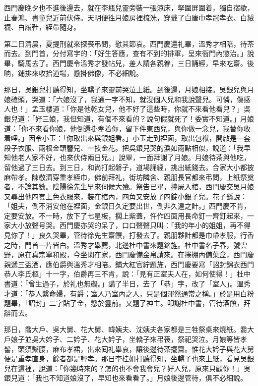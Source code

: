 西門慶晚夕也不進後邊去，就在李瓶兒靈旁裝一張涼床，拏圍屏圍着，獨自宿歇，止春鴻、書童兒近前伏侍。天明便徃月娘房裡梳洗，穿戴了白唐巾孝冠孝衣、白絨襪、白履鞋，絰帶隨身。

第二日清晨，夏提刑就來探䘮弔問，慰其節哀。西門慶還礼畢，溫秀才相陪，待茶而去。到門首，分付寫字的：「好生答應，查有不到的排軍，呈來衙門內懲治。」說畢，騎馬去了。西門慶令溫秀才發帖兒，差人請各親眷，三日誦經，早來吃齋。後晌，鋪排來收拾道場，懸掛佛像，不必細說。

那日，吳銀兒打聽得知，坐轎子來靈前哭泣上紙。到後邊，月娘相接。吳銀兒與月娘磕頭，哭道：「六娘沒了，我通一字不知，就沒個人兒和我說聲兒。可憐，傷感人也！」孟玉樓道：「你是他乾女兒，他不好了這些時，你就不來看他看兒？」吳銀兒道：「好三娘，我但知道，有個不來看的？說句假就死了！委實不知道。」月娘道：「你不來看你娘，他倒還掛牽着你，留下件東西兒，與你做一念兒，我替你收着哩。」因令小玉：「你取出來與銀姐看。」小玉走到裡面，取出包袱，開啟是一套段子衣服、兩根金頭簪兒、一技金花。把吳銀兒哭的淚如雨點相似，{}說道：「我早知他老人家不好，也來伏侍兩日兒。」說畢，一面拜謝了月娘。月娘待茶與他吃，留他過了三日去。到三日，和尚打起磐子，道場誦經，挑出紙錢去。合家大小都披麻帶孝。陳敬濟穿重孝絰巾，佛前拜礼，街坊隣舍、親朋長官都來弔問，上紙祭奠者，不論其數。陰陽徐先生早來伺候大殮。祭告已畢，擡屍入棺，西門慶交吳月娘又尋出他四套上色衣服來，裝在棺內，四角又安放了四錠小銀子兒。花子繇說：「姐夫，倒不消安他在裡面，金銀日久定要出世，倒非久遠之計。」西門慶不肯，定要安放。不一時，放下了七星板，擱上紫蓋，仵作四面用長命釘一齊釘起來，一家大小放聲号哭。西門慶亦哭的呆了，口口聲聲只叫：「我的年小的姐姐，再不得見你了！」良久哭畢，管待徐先生齋饌，打發去了。親朋夥計都是巾帶孝服，行香之時，門首一片皆白。溫秀才舉薦，北邊杜中書來題銘旌。杜中書名子春，號雲野，原在真宗寧和殿，今坐閑在家，西門慶備金帛請來。在捲棚內備菓盒，西門慶親遞三盃酒，應伯爵與溫秀才相陪。鋪大紅官紵題旌，西門慶要寫「詔封錦衣西門恭人李氏柩」十一字，伯爵再三不肯，說：「見有正室夫人在，如何使得！」{}杜中書道：「曾生過子，於礼也無礙。」講了半日，去了「恭」字，改了「室人」。溫秀才道：「恭人繫命婦，有爵；室人乃室內之人，只是個渾然通常之稱。」於是用白粉題畢，「詔封」二字貼了金，懸於靈前。又題了神主。叩謝杜中書，管待酒饌，拜辭而去。

那日，喬大戶、吳大舅、花大舅、韓姨夫、沈姨夫各家都是三牲祭桌來燒紙。喬大戶娘子並吳大妗子、二妗子、花大妗子，坐轎子來弔䘮，祭祀哭泣。月娘等皆孝髻，頭須繫腰，麻布孝裙，出來囘礼舉哀，讓後邊待茶擺齋。惟花大妗子與花大舅便是重孝直身，餘者都是輕孝。那日李桂姐打聽得知，坐轎子也來上紙，看見吳銀兒在這裡，說道：「你幾時來的？怎的也不會我會兒？好人兒，原來只顧你！」吳銀兒道：「我也不知道娘沒了，早知也來看看了。」月娘後邊管待，俱不必細說。

